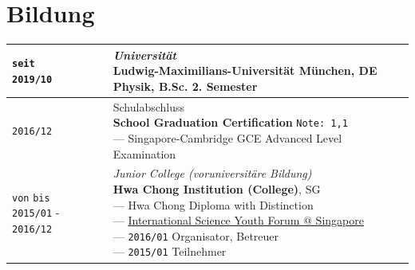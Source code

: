 \documentclass[11pt]{article}
\newcommand{\job}[1]{\textbf{#1}}
\begin{document}
\fontsize{12}{13}\selectfont %

\section{\textcolor{section_1}{Bildung}}
	\begin{center}
		\renewcommand{\arraystretch}{1.3}
		\renewcommand{\cellalign}{lt}
		\begin{tabularx}{0.9\textwidth}{  p{4cm}  X  }
			\makecell{\texttt{\footnotesize seit} \\ \texttt{2019{\footnotesize /10}}} &
			\makecell{\textcolor{schtitles}{\small \textit{Universität}} \\ \job{Ludwig-Maximilians-Universität München}, DE\\Physik, B.Sc. \hfill 2. Semester} \\ %
			\midrule
			\texttt{2016{\footnotesize /12}} & \makecell{\textcolor{schtitles}{\small Schulabschluss} \\\job{School Graduation Certification} \hfill \texttt{\small Note: 1,1}  \\ --- {\scriptsize Singapore-Cambridge GCE Advanced Level Examination} \vspace{0.5em}}\\
			\midrule			
			\makecell{\texttt{\footnotesize von} \hspace{2.4em} \texttt{\footnotesize bis} \\ \texttt{2015{\footnotesize /01}} - \texttt{2016{\footnotesize /12}}} & \makecell{\textcolor{schtitles}{\small \textit{Junior College {\footnotesize (voruniversitäre Bildung)}}} \\ \job{Hwa Chong Institution (College)}, SG 
				\\ --- {\scriptsize Hwa Chong Diploma with Distinction}
				\\ --- {\scriptsize \href{https://en.wikipedia.org/wiki/International_Science_Youth_Forum_@_Singapore}{International Science Youth Forum @ Singapore}}
				\\ {\transparent{0}---} \texttt{2016{\footnotesize /01}} {\scriptsize Organisator, Betreuer}
				\\ {\transparent{0}---} \texttt{2015{\footnotesize /01}} {\scriptsize Teilnehmer}
			} \\[1.5em]


\end{tabularx}
\end{center}
\end{document}
